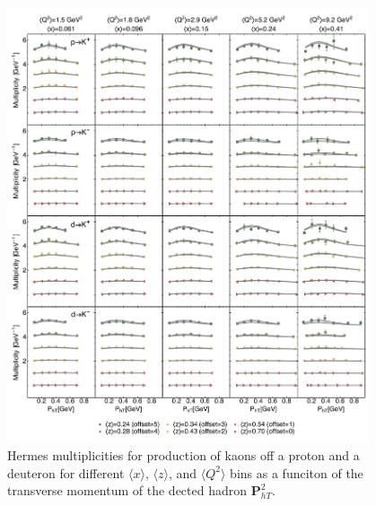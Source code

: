 \documentclass[aps,preprintnumbers,showpacs,nofootinbib,superscriptaddress,floatfix]{revtex4}
\begin{document}
\begin{figure}[h!]
\begin{center}
\includegraphics[width=0.95\textwidth]{plots/Hermes_Kaons_SCIplot_flINDEP.pdf}
\end{center}
\caption{Hermes multiplicities for production of kaons off a proton and a deuteron for different $\langle x \rangle$, $\langle z \rangle$, and $\langle Q^2 \rangle$ bins as a funciton of the transverse momentum of the dected hadron ${\bm P}_{hT}^ 2$.} 
\label{f:H_kaons}
\end{figure}
\end{document}
